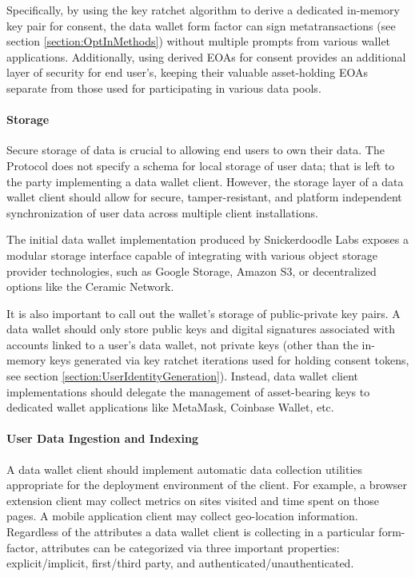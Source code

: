 Specifically, by using the key ratchet algorithm to derive a dedicated in-memory key pair for consent, the data wallet form factor can sign metatransactions (see section \ref{section:OptInMethods}) without multiple prompts from various wallet applications. Additionally, using derived EOAs for consent provides an additional layer of security for end user's, keeping their valuable asset-holding EOAs separate from those
used for participating in various data pools. 

\paragraph{Storage}
\label{section:storage}

Secure storage of data is crucial to allowing end users to own their data. The Protocol does not specify a schema for local storage of user data; that is left to the party implementing a data wallet client. However, the storage layer of a data wallet client should allow for secure, tamper-resistant, and platform independent synchronization of user data across multiple client installations.  

The initial data wallet implementation produced by Snickerdoodle Labs exposes a modular storage interface capable of integrating with various object storage provider technologies, 
such as Google Storage, Amazon S3, or decentralized options like the Ceramic Network.

It is also important to call out the wallet's storage of public-private key pairs. A data wallet should only store public keys 
and digital signatures associated with accounts linked to a user's data wallet, not private keys (other than the in-memory keys generated via key ratchet iterations used for holding consent tokens, see section \ref{section:UserIdentityGeneration}). 
Instead, data wallet client implementations should delegate the management of asset-bearing keys to dedicated wallet applications like MetaMask, Coinbase Wallet, etc. 


\paragraph{User Data Ingestion and Indexing}
\label{section:DataIngestion}

A data wallet client should implement automatic data collection utilities appropriate for the deployment environment of the client. For example, a browser extension client may collect metrics on sites visited and time spent on those pages. A mobile application client may collect geo-location information. Regardless of 
the attributes a data wallet client is collecting in a particular form-factor, attributes can be categorized via three important properties: explicit/implicit, first/third party, and authenticated/unauthenticated. 


